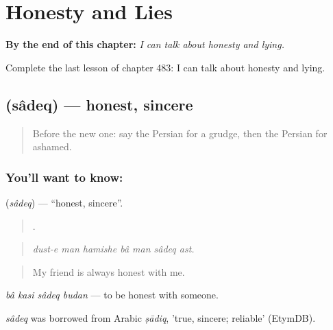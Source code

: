 
\chapter{Honesty and Lies}
\label{ch:fa-honesty-and-lies}

\begin{chapteropening}
\textbf{By the end of this chapter:} \emph{I can talk about honesty and lying.}

Complete the last lesson of chapter 483: I can talk about honesty and lying.
\end{chapteropening}

\section[\texorpdfstring{\fa{صادق} (sâdeq)}{صادق (sâdeq)}]{ (sâdeq) — honest, sincere}

\label{lesson:FA-C483-sadeq}



\begin{quote}
Before the new one: say the Persian for a grudge, then the Persian for ashamed.
\end{quote}

\subsection*{You'll want to know: }
\textbf{} (\emph{sâdeq}) — \textquotedblleft{}honest, sincere\textquotedblright{}.

\begin{quote}
      .
\end{quote}

\begin{quote}
\emph{dust-e man hamishe bâ man sâdeq ast.}
\end{quote}

\begin{quote}
My friend is always honest with me.
\end{quote}

\emph{bâ kasi sâdeq budan} — to be honest with someone.

\begin{cousinweb}
\emph{sâdeq} was borrowed from Arabic \emph{ṣādiq}, 'true, sincere; reliable' (EtymDB).
\end{cousinweb}

